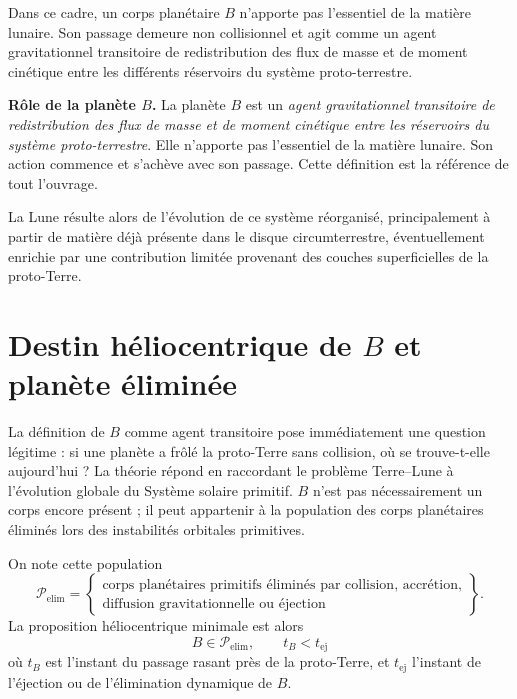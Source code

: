 \documentclass[11pt,a4paper,openany]{report}
\begin{document}
Dans ce cadre, un corps planétaire $B$ n'apporte pas l'essentiel de la matière lunaire. Son passage demeure non collisionnel et agit comme un agent
gravitationnel transitoire de redistribution des flux de masse et de moment cinétique entre les
différents réservoirs du système proto-terrestre.

\begin{definition}
\textbf{Rôle de la planète $B$.} La planète $B$ est un \emph{agent gravitationnel transitoire de
redistribution des flux de masse et de moment cinétique entre les réservoirs du système
proto-terrestre}. Elle n'apporte pas l'essentiel de la matière lunaire. Son
action commence et s'achève avec son passage. Cette définition est la référence de tout
l'ouvrage.
\end{definition}

La Lune résulte alors de l'évolution de ce système réorganisé, principalement à partir de matière
déjà présente dans le disque circumterrestre, éventuellement enrichie par une contribution
limitée provenant des couches superficielles de la proto-Terre.

\section{Destin héliocentrique de \texorpdfstring{$B$}{B} et planète éliminée}
\label{sec:destinB}

La définition de $B$ comme agent transitoire pose immédiatement une question légitime : si une
planète a frôlé la proto-Terre sans collision, où se trouve-t-elle aujourd'hui ? La théorie répond en
raccordant le problème Terre--Lune à l'évolution globale du Système solaire primitif. $B$ n'est pas
nécessairement un corps encore présent ; il peut appartenir à la population des corps planétaires
éliminés lors des instabilités orbitales primitives.

On note cette population
\begin{equation}
\mathcal{P}_{\mathrm{elim}}=
\left\{\begin{array}{l}
\text{corps planétaires primitifs éliminés par collision, accrétion,}\\
\text{diffusion gravitationnelle ou éjection}
\end{array}\right\}.
\label{eq:Pelim}
\end{equation}
La proposition héliocentrique minimale est alors
\begin{equation}
\boxed{\;B\in\mathcal{P}_{\mathrm{elim}},\qquad t_B<t_{\mathrm{ej}}\;}
\label{eq:tB-tej}
\end{equation}
où $t_B$ est l'instant du passage rasant près de la proto-Terre, et $t_{\mathrm{ej}}$ l'instant de
l'éjection ou de l'élimination dynamique de $B$.
\end{document}

